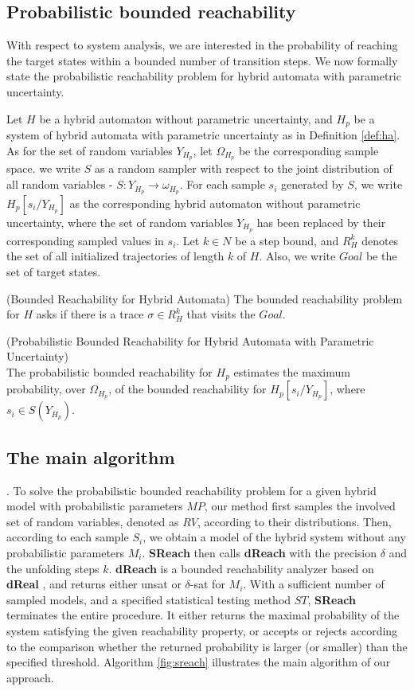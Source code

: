 \subsection{Probabilistic bounded reachability}
With respect to system analysis, we are interested in the probability of reaching the target states within a bounded number of transition steps. We now formally state the probabilistic reachability problem for hybrid automata with parametric uncertainty. 

Let $H$ be a hybrid automaton without parametric uncertainty, and $H_p$ be a system of hybrid automata with parametric uncertainty as in Definition \ref{def:ha}. As for the set of random variables $Y_{H_p}$, let $\Omega_{H_p}$ be the corresponding sample space. we write $S$ as a random sampler with respect to the joint distribution of all random variables - $S: Y_{H_p} \to \omega_{H_p}$. For each sample $s_i$ generated by $S$, we write $H_{p}[s_i/Y_{H_p}]$ as the corresponding hybrid automaton without parametric uncertainty, where the set of random variables $Y_{H_p}$ has been replaced by their corresponding sampled values in $s_i$. Let $k \in N$ be a step bound, and $R_{H}^k$ denotes the set of all initialized trajectories of length $k$ of $H$. Also, we write $Goal$ be the set of target states.
\begin{remark}
\label{def:br}
{\rm (Bounded Reachability for Hybrid Automata)}
The bounded reachability problem for $H$ asks if there is a trace $\sigma \in R_{H}^k$ that visits the $Goal$.
\end{remark}
\begin{definition}
\label{def:pbr}
{\rm (Probabilistic Bounded Reachability for Hybrid Automata with Parametric Uncertainty)}\\
The probabilistic bounded reachability for $H_p$ estimates the maximum probability, over $\Omega_{H_p}$, of the bounded reachability for $H_{p}[s_i/Y_{H_p}]$, where $s_i \in S(Y_{H_p})$.
\end{definition}

\subsection{The main algorithm}.
To solve the probabilistic bounded reachability problem for a given hybrid model with probabilistic parameters $MP$, our method first samples the involved set of random variables, denoted as $RV$, according to their distributions. Then, according to each sample $S_i$, we obtain a model of the hybrid system without any probabilistic parameters $M_i$. {\bf SReach} then calls {\bf dReach} \cite{gaodelta} with the precision $\delta$ and the unfolding steps $k$. {\bf dReach} is a bounded reachability analyzer based on {\bf dReal} \cite{gao2013dreal}, and returns either unsat or $\delta$-sat for $M_i$. With a sufficient number of sampled models, and a specified statistical testing method $ST$, {\bf SReach} terminates the entire procedure. It either returns the maximal probability of the system satisfying the given reachability property, or accepts or rejects according to the comparison whether the returned probability is larger (or smaller) than the specified threshold. Algorithm \ref{fig:sreach} illustrates the main algorithm of our approach.

